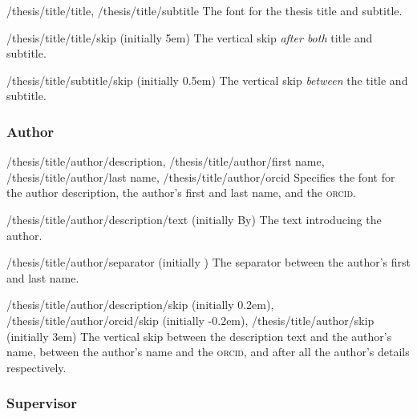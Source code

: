 \begin{fontkeylist}{
    /thesis/title/title,
    /thesis/title/subtitle}
  The font for the thesis title and subtitle.
\end{fontkeylist}

\begin{key}{/thesis/title/title/skip (initially 5em)}
  The vertical skip \emph{after both} title and subtitle.
\end{key}

\begin{key}{/thesis/title/subtitle/skip (initially 0.5em)}
  The vertical skip \emph{between} the title and subtitle.
\end{key}

\subsubsection{Author}
\label{subsubsec:author}

\begin{fontkeylist}{
    /thesis/title/author/description,
    /thesis/title/author/first name,
    /thesis/title/author/last name,
    /thesis/title/author/orcid}
  Specifies the font for the author description, the author's first and last
  name, and the \textsc{orcid}.
\end{fontkeylist}

\begin{key}{/thesis/title/author/description/text (initially By)}
  The text introducing the author.
\end{key}

\begin{key}{/thesis/title/author/separator (initially \string\space)}
  The separator between the author's first and last name.
\end{key}

\begin{keylist}{
    /thesis/title/author/description/skip (initially 0.2em),
    /thesis/title/author/orcid/skip (initially -0.2em),
    /thesis/title/author/skip (initially 3em)}
  The vertical skip between the description text and the author's name, between
  the author's name and the \textsc{orcid}, and after all the author's details
  respectively.
\end{keylist}

\subsubsection{Supervisor}
\label{subsubsec:supervisor}

